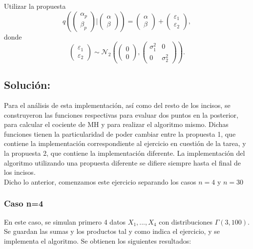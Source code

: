 \documentclass[letterpaper]{article}
\newcommand{\1}{\mathds{1}}
\theoremstyle{definition}
\theoremstyle{definition}
\theoremstyle{definition}
\theoremstyle{definition}
\theoremstyle{definition}
\begin{document}
Utilizar la propuesta 
\[
q \left( \begin{pmatrix}
    \alpha_p\\
    \beta_p
\end{pmatrix} \Bigg|
\begin{pmatrix}
    \alpha\\
    \beta
\end{pmatrix}
\right)= \begin{pmatrix}
    \alpha\\
    \beta
\end{pmatrix}
+
\begin{pmatrix}
    \varepsilon_1\\
    \varepsilon_2
\end{pmatrix},    
\]
donde 
\[
\begin{pmatrix}
    \varepsilon_1\\
    \varepsilon_2
\end{pmatrix}    
\sim 
\mathcal{N}_2 \left( \begin{pmatrix}
    0\\
    0
\end{pmatrix},
\begin{pmatrix}
    \sigma_1^2 & 0\\
    0 & \sigma_2^2
\end{pmatrix}\right).
\]
\subsection*{Solución:}

Para el análisis de esta implementación, así como del resto de los incisos, se construyeron las funciones respectivas para evaluar dos puntos en la 
posterior, para calcular el cociente de MH y para realizar el algoritmo mismo. Dichas funciones tienen 
la particularidad de poder cambiar entre la propuesta 1, que contiene la implementación correspondiente al ejercicio en cuestión 
de la tarea, y la propuesta 2, que contiene la implementación diferente. La implementación del algoritmo utilizando una propuesta diferente se difiere siempre hasta el final de los incisos.\\

Dicho lo anterior, comenzamos este ejercicio separando los casos $n=4$ y $n=30$
\subsubsection*{Caso n=4}
En este caso, se simulan primero 4 datos $X_1,...,X_4$ con distribuciones $\Gamma(3,100)$. Se guardan 
las sumas y los productos tal y como indica el ejercicio, y se implementa el algoritmo. Se obtienen los siguientes resultados:
\end{document}
